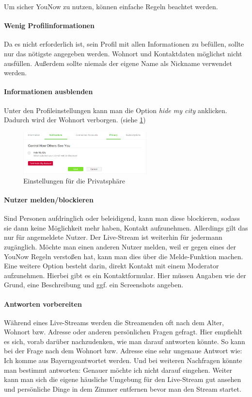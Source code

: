 Um sicher YouNow zu nutzen, können einfache Regeln beachtet werden. 

\paragraph{Wenig Profilinformationen}
Da es nicht erforderlich ist, sein Profil mit allen Informationen zu befüllen, sollte nur das nötigste angegeben werden. Wohnort und Kontaktdaten möglichst nicht ausfüllen. Außerdem sollte niemals der eigene Name als Nickname verwendet werden.


\paragraph{Informationen ausblenden}
Unter den Profileinstellungen kann man die Option \textit{hide my city} anklicken. Dadurch wird der Wohnort verborgen. (siehe \ref{privats_einstellung})

\begin{figure}[!ht]
\centering
\includegraphics[width=0.6\textwidth]{./resources/younow_hide_my_city}
\caption{Einstellungen für die Privatsphäre}
\label{privats_einstellung}
\end{figure} 

\paragraph{Nutzer melden/blockieren}
Sind Personen aufdringlich oder beleidigend, kann man diese blockieren, sodass sie dann keine Möglichkeit mehr haben, Kontakt aufzunehmen. Allerdings gilt das nur für angemeldete Nutzer. Der Live-Stream ist weiterhin für jedermann zugänglich.
Möchte man einen anderen Nutzer melden, weil er gegen eines der YouNow Regeln verstoßen hat, kann man dies über die Melde-Funktion machen. Eine weitere Option besteht darin, direkt Kontakt mit einem Moderator aufzunehmen. Hierbei gibt es ein Kontaktformular. Hier müssen Angaben wie der Grund, eine Beschreibung und ggf. ein Screenshots angeben.

\paragraph{Antworten vorbereiten}
Während eines Live-Streams werden die Streamenden oft nach dem Alter, Wohnort bzw. Adresse oder anderen persönlichen Fragen gefragt. Hier empfiehlt es sich, vorab darüber nachzudenken, wie man darauf antworten könnte. So kann bei der Frage nach dem Wohnort bzw. Adresse eine sehr ungenaue Antwort wie: \glqq Ich komme aus Bayern\grqq geantwortet werden. Und bei weiteren Nachfragen könnte man bestimmt antworten: \glqq Genauer möchte ich nicht darauf eingehen\grqq .
Weiter kann man sich die eigene häusliche Umgebung für den Live-Stream gut ansehen und persönliche Dinge in dem Zimmer entfernen bevor man den Stream startet. 

